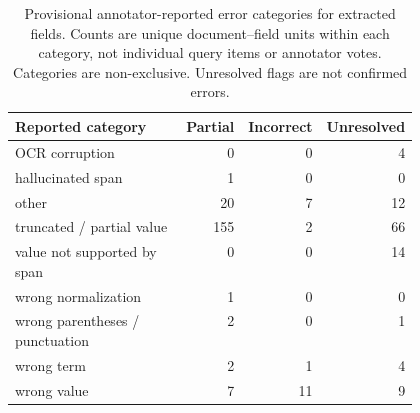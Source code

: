 \begin{table}[t]
\centering
\caption{Provisional annotator-reported error categories for extracted fields. Counts are unique document--field units within each category, not individual query items or annotator votes. Categories are non-exclusive. Unresolved flags are not confirmed errors.}
\begin{tabular}{p{0.47\linewidth}rrr}
\toprule
Reported category & Partial & Incorrect & Unresolved \\
\midrule
OCR corruption & 0 & 0 & 4 \\
hallucinated span & 1 & 0 & 0 \\
other & 20 & 7 & 12 \\
truncated / partial value & 155 & 2 & 66 \\
value not supported by span & 0 & 0 & 14 \\
wrong normalization & 1 & 0 & 0 \\
wrong parentheses / punctuation & 2 & 0 & 1 \\
wrong term & 2 & 1 & 4 \\
wrong value & 7 & 11 & 9 \\
\bottomrule
\end{tabular}
\label{tab:validation-errors}
\end{table}
